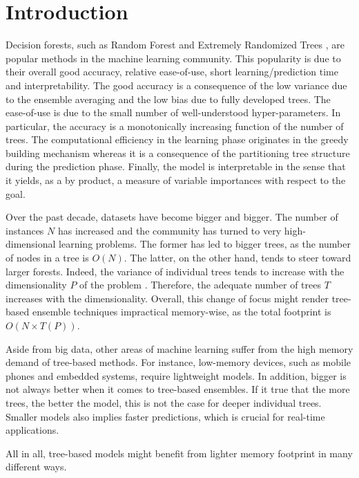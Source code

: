 \documentclass{article}
\begin{document}
\section{Introduction}
\label{sec:introduction}

Decision forests, such as Random Forest \cite{breiman2001random} and
Extremely Randomized Trees \cite{extratrees}, are popular methods in
the machine learning community. This popularity is due to their
overall good accuracy, relative ease-of-use, short learning/prediction
time and interpretability. The good accuracy is a consequence of the
low variance due to the ensemble averaging and the low bias due to
fully developed trees. The ease-of-use is due to the small number of
well-understood hyper-parameters. In particular, the accuracy is a
monotonically increasing function of the number of trees.  The
computational efficiency in the learning phase originates in the
greedy building mechanism whereas it is a consequence of the
partitioning tree structure during the prediction phase. Finally, the
model is interpretable in the sense that it yields, as a by product, a
measure of variable importances with respect to the goal.

Over the past decade, datasets have become bigger and bigger. The number of 
instances $N$ has increased and the community has turned to very 
high-dimensional learning problems. The former has led to bigger trees, as the 
number of nodes in a tree is $O(N)$. The latter, on the other hand, tends to 
steer toward larger forests. Indeed, the variance of individual trees tends to 
increase with the dimensionality $P$ of the problem \cite{l1basedcomp}. 
Therefore, the adequate number of trees $T$ increases with the dimensionality. 
Overall, this change of focus might render tree-based ensemble techniques 
impractical memory-wise, as the total footprint is $O(N \times T(P))$. 

Aside from big data, other areas of machine learning suffer from the
high memory demand of tree-based methods. For instance, low-memory
devices, such as mobile phones and embedded systems, require
lightweight models. In addition, bigger is not always better when it
comes to tree-based ensembles.  If it true that the more trees, the
better the model, this is not the case for deeper individual trees.
Smaller models also implies faster predictions, which is crucial for
real-time applications.

All in all, tree-based models might benefit from lighter memory
footprint in many different ways.
\end{document}
